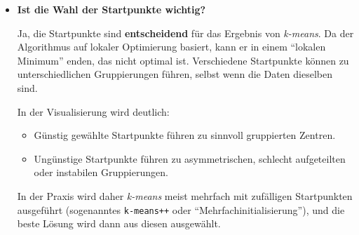 \begin{aufgabe}{3}
\begin{itemize}
  \item \textbf{Ist die Wahl der Startpunkte wichtig?}

    Ja, die Startpunkte sind \textbf{entscheidend} für das Ergebnis von \textit{k-means}. Da der Algorithmus auf lokaler Optimierung basiert, kann er in einem ``lokalen Minimum'' enden, das nicht optimal ist. Verschiedene Startpunkte können zu unterschiedlichen Gruppierungen führen, selbst wenn die Daten dieselben sind.

    In der Visualisierung wird deutlich:
    \begin{itemize}
      \item Günstig gewählte Startpunkte führen zu sinnvoll gruppierten Zentren.
      \item Ungünstige Startpunkte führen zu asymmetrischen, schlecht aufgeteilten oder instabilen Gruppierungen.
    \end{itemize}

    In der Praxis wird daher \textit{k-means} meist mehrfach mit zufälligen Startpunkten ausgeführt (sogenanntes \texttt{k-means++} oder ``Mehrfachinitialisierung''), und die beste Lösung wird dann aus diesen ausgewählt.
\end{itemize}
\end{aufgabe}

